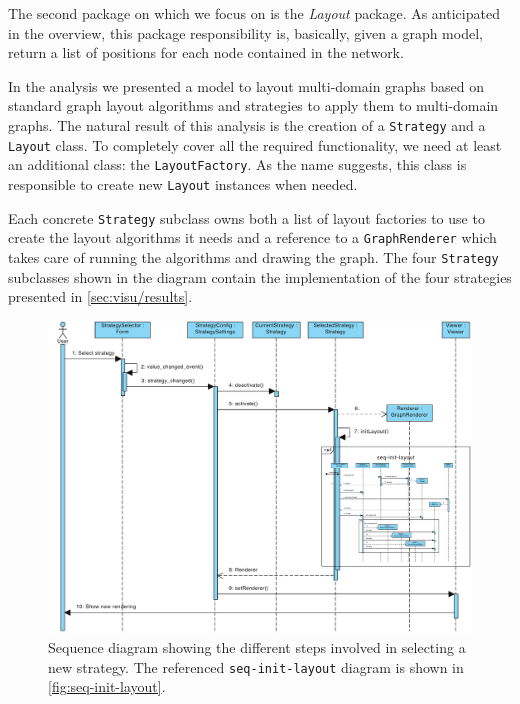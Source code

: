 The second package on which we focus on is the \emph{Layout} package. As anticipated in the overview, this package responsibility is, basically, given a graph model, return a list of positions for each node contained in the network.

In the analysis we presented a model to layout multi-domain graphs based on standard graph layout algorithms and strategies to apply them to multi-domain graphs. The natural result of this analysis is the creation of a \texttt{Strategy} and a \texttt{Layout} class. To completely cover all the required functionality, we need at least an additional class: the \texttt{LayoutFactory}. As the name suggests, this class is responsible to create new \texttt{Layout} instances when needed.

Each concrete \texttt{Strategy} subclass owns both a list of layout factories to use to create the layout algorithms it needs and a reference to a \texttt{GraphRenderer} which takes care of running the algorithms and drawing the graph. The four \texttt{Strategy} subclasses shown in the diagram contain the implementation of the four strategies presented in \vref{sec:visu/results}.

\begin{figure}
  \begin{adjustwidth}{-4.7mm}{-6.5mm}  
    \includegraphics[width=\linewidth]{images/diagrams/seq-strategy}
  \end{adjustwidth}
  \caption[Sequence diagram for the strategy selection process.]{Sequence diagram showing the different steps involved in selecting a new strategy. The referenced \texttt{seq-init-layout} diagram is shown in \vref{fig:seq-init-layout}.}
  \label{fig:seq-strategy}
\end{figure}

